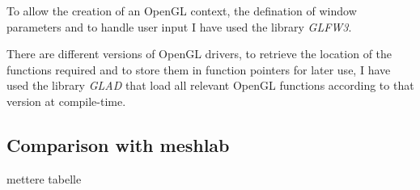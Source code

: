 To allow the creation of an OpenGL context, the defination of window parameters and to handle user input I have used the library \textit{GLFW3}.

There are different versions of OpenGL drivers, to retrieve the location of the functions required and to store them in function pointers for later use, I have used the library \textit{GLAD} that load all relevant OpenGL functions according to that version at compile-time.

\subsection{Comparison with meshlab}
mettere tabelle



